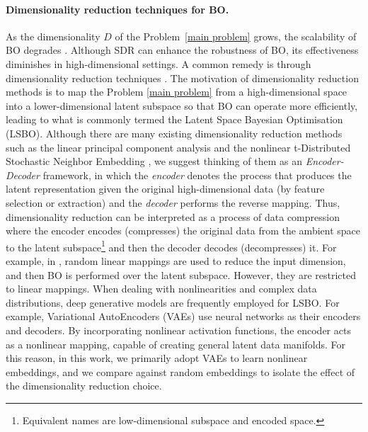 \documentclass[pdflatex,sn-mathphys-num]{sn-jnl}%
\theoremstyle{thmstyleone}%
\theoremstyle{thmstyletwo}%
\theoremstyle{thmstylethree}%
\begin{document}
\paragraph{Dimensionality reduction techniques for BO.}
As the dimensionality $D$ of the Problem~\eqref{main problem} grows, the scalability of BO degrades \cite{hvarfner2024vanillabayesianoptimizationperforms}. Although SDR can enhance the robustness of BO, its effectiveness diminishes in high-dimensional settings. A common remedy is through dimensionality reduction techniques \cite{Moriconi2020quantileGP, Rolland2018, Moriconi2020}. The motivation of dimensionality reduction methods is to map the Problem \eqref{main problem} from a high-dimensional space into a lower-dimensional latent subspace so that BO can operate more efficiently, leading to what is commonly termed the Latent Space Bayesian Optimisation (LSBO). Although there are many existing dimensionality reduction methods such as the linear principal component analysis \cite{Wold1987} and the nonlinear t-Distributed Stochastic Neighbor Embedding \cite{Maaten2008}, we suggest thinking of them as an \textit{Encoder-Decoder} framework, in which the \textit{encoder} denotes the process that produces the latent representation given the original high-dimensional data (by feature selection or extraction) and the \textit{decoder} performs the reverse mapping. Thus, dimensionality reduction can be interpreted as a process of data compression where the encoder encodes (compresses) the original data from the ambient space to the latent subspace\footnote{Equivalent names are low-dimensional subspace and encoded space.} and then the decoder decodes (decompresses) it. For example, in \cite{Wang2013, egorse}, random linear mappings are used to reduce the input dimension, and then BO is performed over the latent subspace. However, they are restricted to linear mappings. When dealing with nonlinearities and complex data distributions, deep generative models \cite{Bond_Taylor_2022} are frequently employed for LSBO. For example, Variational AutoEncoders (VAEs) \cite{kingma2022autoencodingvariationalbayes} use neural networks as their encoders and decoders. By incorporating nonlinear activation functions, the encoder acts as a nonlinear mapping, capable of creating general latent data manifolds. For this reason, in this work, we primarily adopt VAEs to learn nonlinear embeddings, and we compare against random embeddings to isolate the effect of the dimensionality reduction choice.\\
\end{document}
